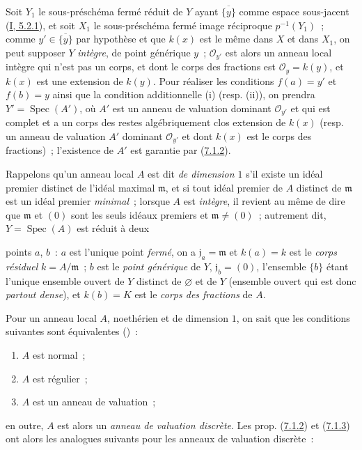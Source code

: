 Soit $Y_1$ le sous-préschéma fermé réduit de $Y$ ayant
$\overline{\{y\}}$ comme espace sous-jacent
(\hyperref[I.5.2.1-fr]{I, 5.2.1}), et soit $X_1$ le sous-préschéma fermé
image réciproque $p^{-1}(Y_1)$~; comme $y'\in\overline{\{y\}}$ par hypothèse
et que $k(x)$ est le même dans $X$ et dans $X_1$, on peut supposer $Y$
\emph{intègre}, de point générique $y$~; $\mathcal{O}_{y'}$ est alors un
anneau local intègre qui n'est pas un corps, et dont le corps des fractions
est $\mathcal{O}_y=k(y)$, et $k(x)$ est une extension de $k(y)$. Pour
réaliser les conditions $f(a)=y'$ et $f(b)=y$ ainsi que la condition
additionnelle (i) (resp. (ii)), on prendra
$Y'=\operatorname{Spec}(A')$, où $A'$ est un anneau de valuation dominant
$\mathcal{O}_{y'}$ et qui est complet et a un corps des restes
algébriquement clos extension de $k(x)$ (resp. un anneau de valuation $A'$
dominant $\mathcal{O}_{y'}$ et dont $k(x)$ est le corps des fractions)~;
l'existence de $A'$ est garantie par
(\hyperref[II.7.1.2-fr]{7.1.2}).

\begin{env}[7.1.5]
\label{II.7.1.5-fr}
Rappelons qu'un anneau local $A$ est dit \emph{de dimension $1$} s'il existe
un idéal premier distinct de l'idéal maximal $\mathfrak{m}$, et si tout idéal
premier de $A$ distinct de $\mathfrak{m}$ est un idéal premier
\emph{minimal}~; lorsque $A$ est \emph{intègre}, il revient au même de dire
que $\mathfrak{m}$ et $(0)$ sont les seuls idéaux premiers et
$\mathfrak{m}\neq(0)$~; autrement dit, $Y=\operatorname{Spec}(A)$ est
réduit à deux


points $a$, $b$~: $a$ est l'unique point \emph{fermé}, on a
$\mathfrak{j}_a=\mathfrak{m}$ et $k(a)=k$ est le \emph{corps résiduel}
$k=A/\mathfrak{m}$~; $b$ est le \emph{point générique} de $Y$,
$\mathfrak{j}_b=(0)$, l'ensemble $\{b\}$ étant l'unique ensemble ouvert de
$Y$ distinct de $\varnothing$ et de $Y$ (ensemble ouvert qui est donc
\emph{partout dense}), et $k(b)=K$ est le \emph{corps des fractions} de $A$.
\end{env}

\begin{env}[7.1.6]
\label{II.7.1.6-fr}
Pour un anneau local $A$, noethérien et de dimension $1$, on sait que les
conditions suivantes sont équivalentes
(\cite[p.~2-08 et 17-01]{I-1})~:
\begin{enumerate}
\item[\rm{a)}] $A$ est normal~;
\item[\rm{b)}] $A$ est régulier~;
\item[\rm{c)}] $A$ est un anneau de valuation~;
\end{enumerate}
en outre, $A$ est alors un \emph{anneau de valuation discrète}. Les prop.
(\hyperref[II.7.1.2-fr]{7.1.2}) et
(\hyperref[II.7.1.3-fr]{7.1.3}) ont alors les analogues suivants pour les
anneaux de valuation discrète~:
\end{env}


